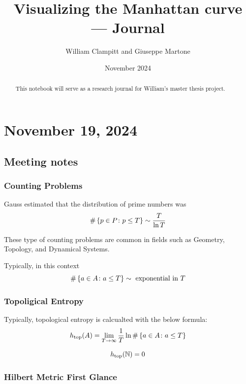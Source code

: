 \documentclass{amsart}
\title{Visualizing the Manhattan curve --- Journal}
\author{William Clampitt and Giuseppe Martone}
\date{November 2024}
\begin{document}
\begin{abstract}
    This notebook will serve as a research journal for William's master thesis project.
\end{abstract}

\maketitle
\tableofcontents


\section{November 19, 2024}
\subsection{Meeting notes}
\subsubsection{Counting Problems}
	Gauss estimated that the distribution of prime numbers was 
	\begin{equation*}
		\# \left\{p \in P \colon p \leq T\right\} \sim \frac{T}{\ln T} 
	\end{equation*}
	
	These type of counting problems are common in fields such as Geometry, Topology, and Dynamical Systems. 
	
	Typically, in this context
	\begin{equation*}
		\# \left\{ a \in A \colon a \leq T\right\} \sim \text{ exponential in } T
	\end{equation*}
	
	\subsubsection*{Topoligical Entropy}
	Typically, topological entropy is calcualted with the below formula:
	\begin{equation*}
		h_{\text{top}}(A) = \lim_{T \to \infty} \frac{1}{T} \ln \# \left\{a \in A \colon a \leq T\right\}
	\end{equation*}
	
	\begin{example*}
		\begin{equation*}
			h_{\text{top}}(\mathbb{N}) = 0
		\end{equation*}
	\end{example*}
	
	\subsubsection*{Hilbert Metric First Glance}
	
\end{document}
